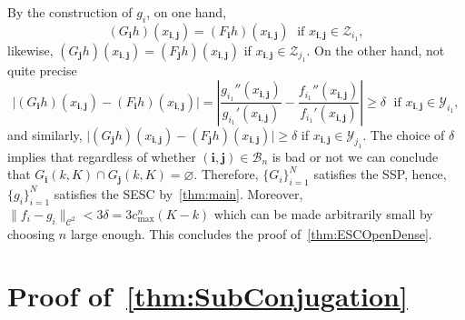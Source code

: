 \documentclass[12pt,]{article}
\def\cref#1{\ref{#1}}%
\theoremstyle{definition}
\theoremstyle{remark}
\newcommand{\0}{\mathbf{0}}
\newcommand{\bi}{\mathbf{i}}
\newcommand{\bj}{\mathbf{j}}
\begin{document}
{By the construction of $g_i$, on one hand,
\begin{equation*}
(G_{\bi}h)(x_{\bi,\bj})=(F_{\bi}h)(x_{\bi,\bj}) \; \text{ if } x_{\bi,\bj}\in\mathcal{Z}_{i_1}, 
\end{equation*}
likewise, $(G_{\bj}h)(x_{\bi,\bj})=(F_{\bj}h)(x_{\bi,\bj})$ if $x_{\bi,\bj}\in\mathcal{Z}_{j_1}$. On
the other hand, {\color{red}not quite precise}
\begin{equation*}
\big|(G_{\bi}h)(x_{\bi,\bj})-(F_{\bi}h)(x_{\bi,\bj})\big| = \left|
\frac{g_{i_1}''(x_{\bi,\bj})}{g_{i_1}'(x_{\bi,\bj})} -
\frac{f_{i_1}''(x_{\bi,\bj})}{f_{i_1}'(x_{\bi,\bj})} \right|\geq \delta \; \text{ if }
x_{\bi,\bj}\in\mathcal{Y}_{i_1},
\end{equation*}
and similarly, $\big|(G_{\bj}h)(x_{\bi,\bj})-(F_{\bj}h)(x_{\bi,\bj})\big|\geq \delta$ if
$x_{\bi,\bj}\in\mathcal{Y}_{j_1}$. The choice of $\delta$ implies that regardless of whether
$(\bi,\bj)\in\mathcal{B}_n$ is bad or not we can conclude that $G_{\bi}(k,K)\cap
G_{\bj}(k,K)=\varnothing$. Therefore, $\{G_i\}_{i=1}^N$ satisfies the SSP, hence, $\{g_i\}_{i=1}^N$
satisfies the SESC by~\cref{thm:main}. Moreover,
$\|f_i-g_i\|_{\mathcal{C}^2}<3\delta=3c_{\max}^n(K-k)$ which can be made arbitrarily small by
choosing $n$ large enough. This concludes the proof of~\cref{thm:ESCOpenDense}.   

\section{Proof of~\cref{thm:SubConjugation}}\label{sec:ProofConjugation}

}
\end{document}
